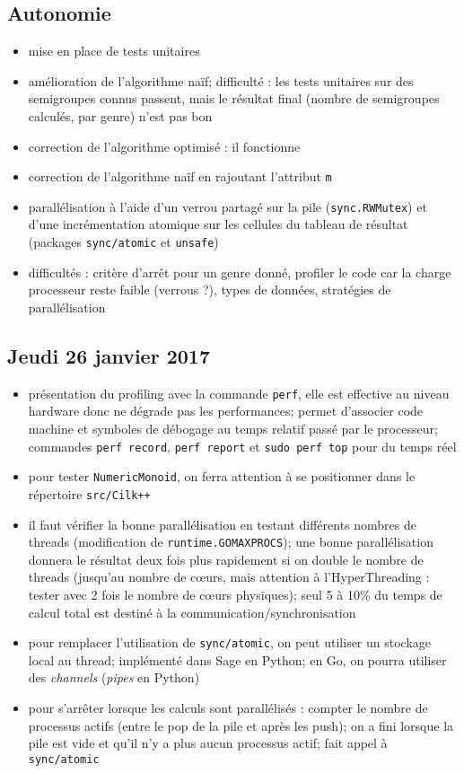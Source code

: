 \documentclass[12pt,a4paper]{article}
\begin{document}
\subsection*{Autonomie}
\begin{itemize}
	\item	mise en place de tests unitaires
	\item	amélioration de l'algorithme naïf; difficulté : les tests unitaires sur des semigroupes connus passent, mais le résultat final (nombre de semigroupes calculés, par genre) n'est pas bon
	\item	correction de l'algorithme optimisé : il fonctionne
	\item	correction de l'algorithme naïf en rajoutant l'attribut \texttt{m}
	\item	parallélisation à l'aide d'un verrou partagé sur la pile (\texttt{sync.RWMutex}) et d'une incrémentation atomique sur les cellules du tableau de résultat (packages \texttt{sync/atomic} et \texttt{unsafe})
	\item	difficultés : critère d'arrêt pour un genre donné, profiler le code car la charge processeur reste faible (verrous ?), types de données, stratégies de parallélisation
\end{itemize}

\subsection*{Jeudi 26 janvier 2017}
\begin{itemize}
	\item	présentation du profiling avec la commande \texttt{perf}, elle est effective au niveau hardware donc ne dégrade pas les performances; permet d'associer code machine et symboles de débogage au temps relatif passé par le processeur; commandes \texttt{perf record}, \texttt{perf report} et \texttt{sudo perf top} pour du temps réel
	\item	pour tester \texttt{NumericMonoid}, on ferra attention à se positionner dans le répertoire \texttt{src/Cilk++}
	\item	il faut vérifier la bonne parallélisation en testant différents nombres de threads (modification de \texttt{runtime.GOMAXPROCS}); une bonne parallélisation donnera le résultat deux fois plus rapidement si on double le nombre de threads (jusqu'au nombre de c\oe{}urs, mais attention à l'HyperThreading : tester avec 2 fois le nombre de c\oe{}urs physiques); seul 5 à 10\% du temps de calcul total est destiné à la communication/synchronisation
	\item	pour remplacer l'utilisation de \texttt{sync/atomic}, on peut utiliser un stockage local au thread; implémenté dans Sage en Python; en Go, on pourra utiliser des \emph{channels} (\emph{pipes} en Python)
	\item	pour s'arrêter lorsque les calculs sont parallélisés : compter le nombre de processus actifs (entre le pop de la pile et après les push); on a fini lorsque la pile est vide et qu'il n'y a plus aucun processus actif; fait appel à \texttt{sync/atomic}
\end{itemize}
\end{document}

